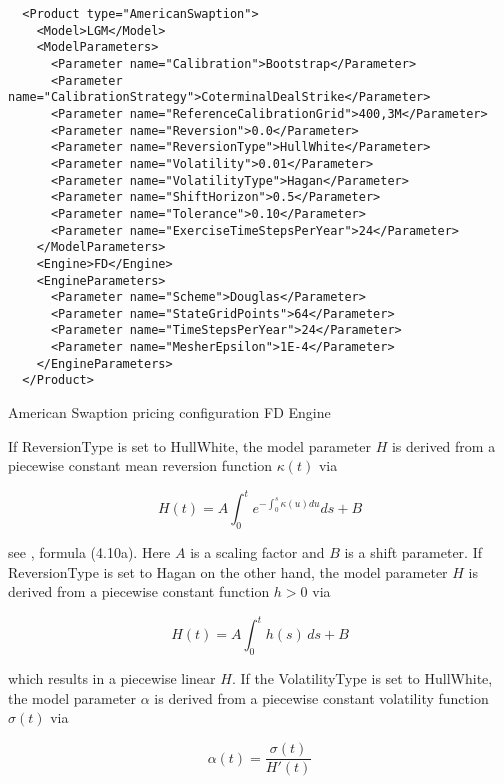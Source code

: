 \begin{listing}[h]
\begin{verbatim}
  <Product type="AmericanSwaption">
    <Model>LGM</Model>
    <ModelParameters>
      <Parameter name="Calibration">Bootstrap</Parameter>
      <Parameter name="CalibrationStrategy">CoterminalDealStrike</Parameter>
      <Parameter name="ReferenceCalibrationGrid">400,3M</Parameter>
      <Parameter name="Reversion">0.0</Parameter>
      <Parameter name="ReversionType">HullWhite</Parameter>
      <Parameter name="Volatility">0.01</Parameter>
      <Parameter name="VolatilityType">Hagan</Parameter>
      <Parameter name="ShiftHorizon">0.5</Parameter>
      <Parameter name="Tolerance">0.10</Parameter>
      <Parameter name="ExerciseTimeStepsPerYear">24</Parameter>
    </ModelParameters>
    <Engine>FD</Engine>
    <EngineParameters>
      <Parameter name="Scheme">Douglas</Parameter>
      <Parameter name="StateGridPoints">64</Parameter>
      <Parameter name="TimeStepsPerYear">24</Parameter>
      <Parameter name="MesherEpsilon">1E-4</Parameter>
    </EngineParameters>
  </Product>
\end{verbatim}
\caption{American Swaption pricing configuration FD Engine}
\label{lst:ir_amswaption_pricing_config_fd}
\end{listing}

If ReversionType is set to HullWhite, the model parameter $H$ is derived from a piecewise constant mean reversion
function $\kappa(t)$ via

\begin{equation}\label{ir_bermswaption_hw_hw_H1}
  H(t) = A \int_0^t e^{-\int_0^s \kappa(u) du} ds + B
\end{equation}

see \cite{Hagan_LGM}, formula (4.10a). Here $A$ is a scaling factor and $B$ is a shift parameter. If ReversionType is set
to Hagan on the other hand, the model parameter $H$ is derived from a piecewise constant function $h>0$ via

\begin{equation}\label{ir_bermswaption_hw_hw_H2}
  H(t) = A \int_0^t h(s)\,ds + B
\end{equation}

which results in a piecewise linear $H$. If the VolatilityType is set to HullWhite, the model parameter $\alpha$ is
derived from a piecewise constant volatility function $\sigma(t)$ via

\begin{equation}\label{ir_bermswaption_hw_hw_alpha}
  \alpha(t) = \frac{\sigma(t)}{H'(t)}
\end{equation}

